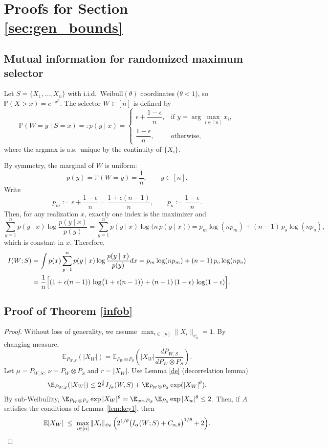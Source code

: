 \documentclass[11pt]{article}
\providecommand{\I}{\frac{1}{\theta}}
\begin{document}
\section{Proofs for Section \ref{sec:gen_bounds}}\label{se:PCT}
\subsection{Mutual information for randomized maximum selector}
Let $S=\{X_1,\ldots,X_n\}$ with i.i.d.\ Weibull\((\theta)\) coordinates
(\(\theta<1\)), so $\mathbb{P}(X>x)=e^{-x^\theta}$. The selector \(W\in[n]\) is
defined by
\[
\mathbb{P}(W=y\mid S=x)=:p(y\mid x)=
\begin{cases}
\epsilon+\dfrac{1-\epsilon}{n}, & \text{if } y=\arg\max_{i\in[n]} x_i,\\[6pt]
\dfrac{1-\epsilon}{n}, & \text{otherwise,}
\end{cases}
\]
where the argmax is a.s.\ unique by the continuity of $\{X_i\}$. 

By symmetry, the marginal of \(W\) is uniform:
\[
p(y)=\mathbb{P}(W=y)=\frac{1}{n},\qquad y\in[n].
\]
Write
\[
p_m:=\epsilon+\frac{1-\epsilon}{n}=\frac{1+\epsilon(n-1)}{n},
\qquad
p_o:=\frac{1-\epsilon}{n}.
\]
Then, for any realization \(x\), exactly one index is the maximizer and
\[
\sum_{y=1}^n p(y\mid x)\log\frac{p(y\mid x)}{p(y)}
=\sum_{y=1}^n p(y\mid x)\log\bigl(n\,p(y\mid x)\bigr)
= p_m\log(n p_m) + (n-1)\,p_o\log(n p_o),
\]
which is constant in \(x\). Therefore,
\begin{align*}
I(W;S)
&=\int p(x)\sum_{y=1}^n p(y\mid x)\log\frac{p(y\mid x)}{p(y)}dx= p_m\log(n p_m) + (n-1)\,p_o\log(n p_o)\\
&=\frac{1}{n}\Bigl[(1+\epsilon(n-1))\,\log\bigl(1+\epsilon(n-1)\bigr)
+ (n-1)\,(1-\epsilon)\,\log(1-\epsilon)\Bigr].
\end{align*}

\subsection{Proof of Theorem \ref{infob}}
\begin{proof}
Without loss of generality, we assume $\max_{i\in[n]}\|X_i\|_{\psi_\theta}=1$. By changing measure,
\[
\mathbb{E}_{P_{W,S}}(|X_W|) = \mathbb{E}_{P_W \otimes P_S} \left(|X_W| \frac{d P_{W,S}}{d P_W \otimes P_S} \right).
\]
Let $\mu = P_{W,S}$, $\nu=P_{W} \otimes P_{S}$ and $r=|X_W|$. Use Lemma \ref{de} (decorrelation lemma)
\[
\E_{P_{W,S}}(|X_W|) \leq 2^\I I_{f_\theta}(W,S) + \E_{P_W \otimes P_S} \exp(|X_W|^\theta).
\]
By sub-Weibullity,
$\E_{P_W \otimes P_S} \exp |X_W|^\theta = \E_{w \sim P_W} \E_{P_S} \exp |X_w|^\theta \leq 2$. Then, if $A$ satisfies the conditions of Lemma~\ref{lem:key1}, then
\[
\mathbb{E}|X_W|
\;\le\;
\max_{i\in[n]}\|X_i\|_{\psi_\theta}\,
\Bigl(2^{1/\theta}\bigl(I_\alpha(W;S)+C_{\alpha,\theta}\bigr)^{1/\theta}+2\Bigr).
\]
\end{proof}
\end{document}
